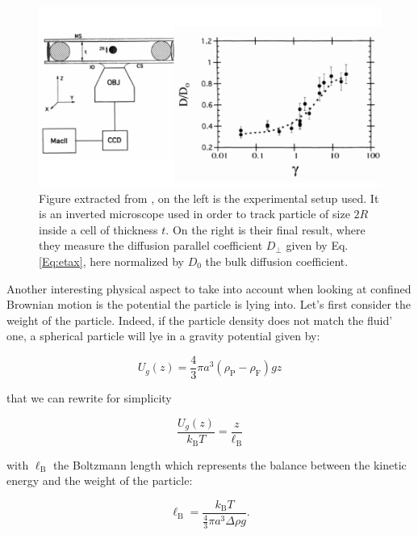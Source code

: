 \begin{figure}
	\centering
	\includegraphics{02_body/chapter1/image/libchaber.pdf}
	\caption{Figure extracted from \cite{faucheux_confined_1994}, on the left is the experimental setup used. It is an inverted microscope used in order to track particle of size $2R$ inside a cell of thickness $t$. On the right is their final result, where they measure the diffusion parallel coefficient $D_\bot$ given by Eq.\ref{Eq:etax}, here normalized by $D_0$ the bulk diffusion coefficient. }
	\label{fig:libchaber}
\end{figure}

Another interesting physical aspect to take into account when looking at confined Brownian motion is the potential the particle is lying into. Let's first consider the weight of the particle. Indeed, if the particle density does not match the fluid' one, a spherical particle will lye in a gravity potential given by:

\begin{equation}
	U_g(z) = \frac{4}{3} \pi a^3 (\rho_\mathrm{P} - \rho_\mathrm{F})gz
\end{equation}


that we can rewrite for simplicity

\begin{equation}
	\frac{U_g(z)}{k_\mathrm{B} T} = \frac{z}{\ell_\mathrm{B}}
\end{equation}

with $\ell_\mathrm{B}$ the Boltzmann length which represents the balance between the kinetic energy and the weight of the particle:

\begin{equation}
	\ell_\mathrm{B} = \frac{k_\mathrm{B} T}{ \frac{4}{3} \pi a^3 \Delta \rho g}.
\end{equation}

